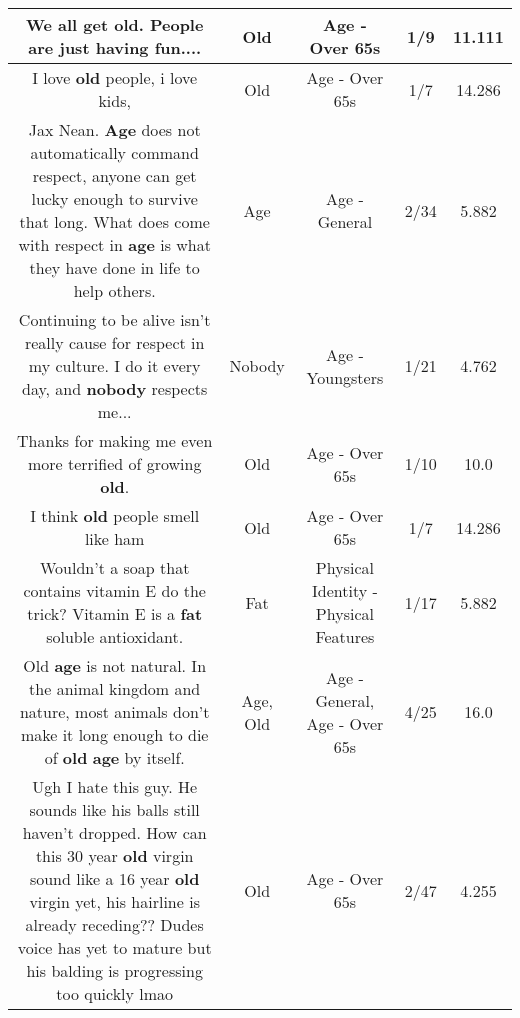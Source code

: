 \documentclass[11pt]{article}
\newlength\mylength
\begin{document}
\begin{center}
\begin{longtable}{|C{.65\mylength}|C{.30\mylength}|C{.12\mylength}|C{.12\mylength}|C{.12\mylength}|}
  \small We all get \textbf{old}. People are just having fun....\normalsize   & Old & Age - Over 65s & 1/9 & 11.111 \\  \hline
  \small I love \textbf{old} people, i love kids,\normalsize   & Old & Age - Over 65s & 1/7 & 14.286 \\  \hline
  \small Jax Nean. \textbf{Age} does not automatically command respect, anyone can get lucky enough to survive that long. What does come with respect in \textbf{age} is what they have done in life to help others.\normalsize   & Age & Age - General & 2/34 & 5.882 \\  \hline
  \small Continuing to be alive isn't really cause for respect in my culture. I do it every day, and \textbf{nobody} respects me...\normalsize   & Nobody & Age - Youngsters & 1/21 & 4.762 \\  \hline
  \small Thanks for making me even more terrified of growing \textbf{old}.\normalsize   & Old & Age - Over 65s & 1/10 & 10.0 \\  \hline
  \small I think \textbf{old} people smell like ham\normalsize   & Old & Age - Over 65s & 1/7 & 14.286 \\  \hline
  \small Wouldn't a soap that  contains vitamin E do the trick? Vitamin E is a \textbf{fat} soluble antioxidant.\normalsize   & Fat & Physical Identity - Physical Features & 1/17 & 5.882 \\  \hline
  \small Old \textbf{age} is not natural. In the animal kingdom and nature, most animals don't make it long enough to die of \textbf{old} \textbf{age} by itself.\normalsize   & Age, Old & Age - General, Age - Over 65s & 4/25 & 16.0 \\  \hline
  \small Ugh I hate this guy. He sounds like his balls still haven't dropped. How can this 30 year \textbf{old} virgin sound like a 16 year \textbf{old} virgin yet, his hairline is already receding?? Dudes voice has yet to mature but his balding is progressing too quickly lmao\normalsize   & Old & Age - Over 65s & 2/47 & 4.255 \\  \hline

\end{longtable}
\end{center}
\end{document}
